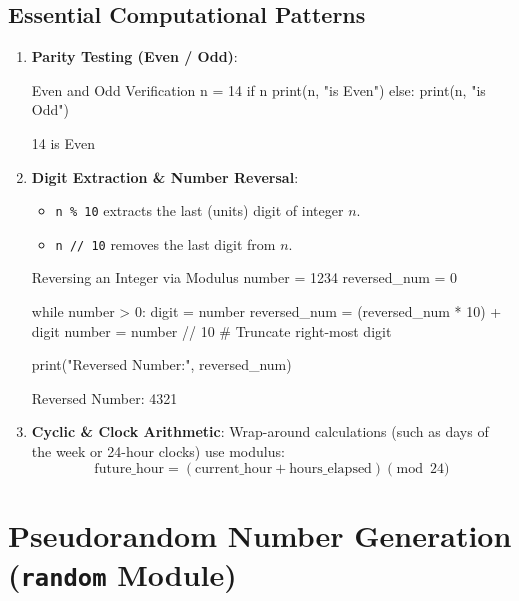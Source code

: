 \subsection{Essential Computational Patterns}
\begin{enumerate}[leftmargin=1.5em]
    \item \textbf{Parity Testing (Even / Odd)}:
    \begin{pythoncode}{Even and Odd Verification}
n = 14
if n %
    print(n, "is Even")
else:
    print(n, "is Odd")
    \end{pythoncode}
    \begin{outputbox}
14 is Even
    \end{outputbox}

    \item \textbf{Digit Extraction \& Number Reversal}:
    \begin{itemize}
        \item \texttt{n \% 10} extracts the last (units) digit of integer $n$.
        \item \texttt{n // 10} removes the last digit from $n$.
    \end{itemize}
    \begin{pythoncode}{Reversing an Integer via Modulus}
number = 1234
reversed_num = 0

while number > 0:
    digit = number %
    reversed_num = (reversed_num * 10) + digit
    number = number // 10        # Truncate right-most digit

print("Reversed Number:", reversed_num)
    \end{pythoncode}
    \begin{outputbox}
Reversed Number: 4321
    \end{outputbox}
    \item \textbf{Cyclic \& Clock Arithmetic}:
    Wrap-around calculations (such as days of the week or 24-hour clocks) use modulus:
    \begin{equation*}
        \text{future\_hour} = (\text{current\_hour} + \text{hours\_elapsed}) \pmod{24}
    \end{equation*}
\end{enumerate}

\section{Pseudorandom Number Generation (\texttt{random} Module)}

